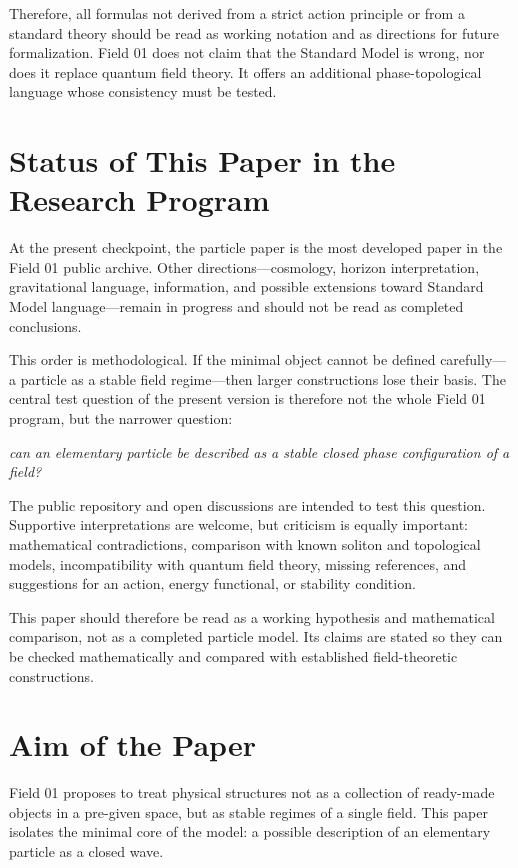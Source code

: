 \documentclass[11pt,a4paper]{article}
\begin{document}
Therefore, all formulas not derived from a strict action principle or from a standard theory should be read as working notation and as directions for future formalization. Field 01 does not claim that the Standard Model is wrong, nor does it replace quantum field theory. It offers an additional phase-topological language whose consistency must be tested.

\section{Status of This Paper in the Research Program}

At the present checkpoint, the particle paper is the most developed paper in the Field 01 public archive. Other directions---cosmology, horizon interpretation, gravitational language, information, and possible extensions toward Standard Model language---remain in progress and should not be read as completed conclusions.

This order is methodological. If the minimal object cannot be defined carefully---a particle as a stable field regime---then larger constructions lose their basis. The central test question of the present version is therefore not the whole Field 01 program, but the narrower question:
\begin{center}
\textit{can an elementary particle be described as a stable closed phase configuration of a field?}
\end{center}

The public repository and open discussions are intended to test this question. Supportive interpretations are welcome, but criticism is equally important: mathematical contradictions, comparison with known soliton and topological models, incompatibility with quantum field theory, missing references, and suggestions for an action, energy functional, or stability condition.

This paper should therefore be read as a working hypothesis and mathematical comparison, not as a completed particle model. Its claims are stated so they can be checked mathematically and compared with established field-theoretic constructions.

\section{Aim of the Paper}

Field 01 proposes to treat physical structures not as a collection of ready-made objects in a pre-given space, but as stable regimes of a single field. This paper isolates the minimal core of the model: a possible description of an elementary particle as a closed wave.
\end{document}
